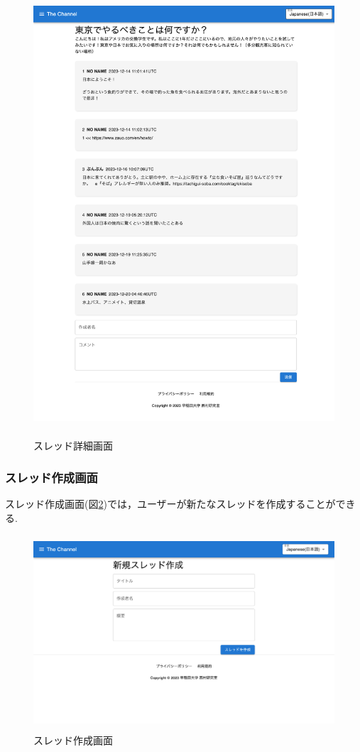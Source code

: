 \documentclass[b5paper,12pt,dvipdfmx]{jsreport}
\begin{document}
\begin{figure}[H]
	\centering
    \includegraphics[width=120mm,height=165.53mm]{./img/screen/thread_detail.png}
	\caption{スレッド詳細画面}
	\label{fig:thread_detail}
\end{figure}


\subsubsection{スレッド作成画面}
スレッド作成画面(図\ref{fig:thread_create})では，ユーザーが新たなスレッドを作成することができる.

\begin{figure}[H]
	\centering
    \includegraphics[width=120mm,height=72.80mm]{./img/screen/thread_create.png}
	\caption{スレッド作成画面}
	\label{fig:thread_create}
\end{figure}
\end{document}
